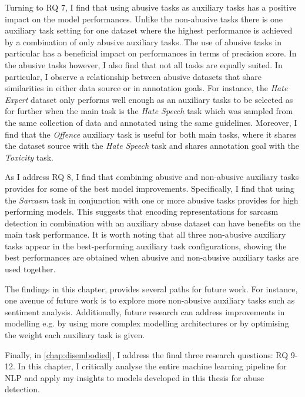 Turning to RQ 7, I find that using abusive tasks as auxiliary tasks has a positive impact on the model performances.
Unlike the non-abusive tasks there is one auxiliary task setting for one dataset where the highest performance is achieved by a combination of only abusive auxiliary tasks.
The use of abusive tasks in particular has a beneficial impact on performances in terms of precision score.
In the abusive tasks however, I also find that not all tasks are equally suited.
In particular, I observe a relationship between abusive datasets that share similarities in either data source or in annotation goals.
For instance, the \textit{Hate Expert} dataset only performs well enough as an auxiliary tasks to be selected as for further when the main task is the \textit{Hate Speech} task which was sampled from the same collection of data and annotated using the same guidelines.
Moreover, I find that the \textit{Offence} auxiliary task is useful for both main tasks, where it shares the dataset source with the \textit{Hate Speech} task and shares annotation goal with the \textit{Toxicity} task.

As I address RQ 8, I find that combining abusive and non-abusive auxiliary tasks provides for some of the best model improvements.
Specifically, I find that using the \textit{Sarcasm} task in conjunction with one or more abusive tasks provides for high performing models.
This suggests that encoding representations for sarcasm detection in combination with an auxiliary abuse dataset can have benefits on the main task performance.
It is worth noting that all three non-abusive auxiliary tasks appear in the best-performing auxiliary task configurations, showing the best performances are obtained when abusive and non-abusive auxiliary tasks are used together.

The findings in this chapter, provides several paths for future work.
For instance, one avenue of future work is to explore more non-abusive auxiliary tasks such as sentiment analysis.
Additionally, future research can address improvements in modelling e.g. by using more complex modelling architectures or by optimising the weight each auxiliary task is given.

Finally, in \cref{chap:disembodied}, I address the final three research questions: RQ 9-12.
In this chapter, I critically analyse the entire machine learning pipeline for NLP and apply my insights to models developed in this thesis for abuse detection.

